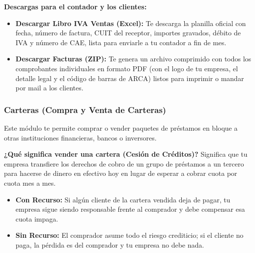\documentclass[12pt,a4paper]{article}
\renewcommand{\_}{\textunderscore\allowbreak}
\begin{document}
\textbf{Descargas para el contador y los clientes:}
\begin{itemize}
    \item \textbf{Descargar Libro IVA Ventas (Excel):} Te descarga la planilla oficial con fecha, número de factura, CUIT del receptor, importes gravados, débito de IVA y número de CAE, lista para enviarle a tu contador a fin de mes.
    \item \textbf{Descargar Facturas (ZIP):} Te genera un archivo comprimido con todos los comprobantes individuales en formato PDF (con el logo de tu empresa, el detalle legal y el código de barras de ARCA) listos para imprimir o mandar por mail a los clientes.
\end{itemize}

\subsubsection{Carteras (Compra y Venta de Carteras)}
Este módulo te permite comprar o vender paquetes de préstamos en bloque a otras instituciones financieras, bancos o inversores.

\textbf{¿Qué significa vender una cartera (Cesión de Créditos)?}
Significa que tu empresa transfiere los derechos de cobro de un grupo de préstamos a un tercero para hacerse de dinero en efectivo hoy en lugar de esperar a cobrar cuota por cuota mes a mes.
\begin{itemize}
    \item \textbf{Con Recurso:} Si algún cliente de la cartera vendida deja de pagar, tu empresa sigue siendo responsable frente al comprador y debe compensar esa cuota impaga.
    \item \textbf{Sin Recurso:} El comprador asume todo el riesgo crediticio; si el cliente no paga, la pérdida es del comprador y tu empresa no debe nada.
\end{itemize}
\end{document}
